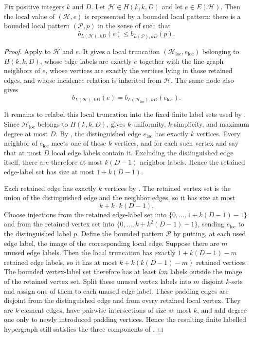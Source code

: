 \begin{helper}
Fix positive integers $k$ and $D$.  Let $\mathcal H\in H(k,k,D)$ and
let $e\in E(\mathcal H)$.  Then the local value of $(\mathcal H,e)$ is
represented by a bounded local pattern: there is a bounded local pattern
$(\mathcal P,p)$ in the sense of
 such that
\[
b_{L(\mathcal H),kD}(e)\le b_{L(\mathcal P),kD}(p).
\]
\end{helper}
\begin{proof}
Apply  to
$\mathcal H$ and $e$.  It gives a local truncation
$(\mathcal H_{\mathrm{loc}},e_{\mathrm{loc}})$ belonging to $H(k,k,D)$,
whose edge labels are exactly $e$ together with the line-graph neighbors of
$e$, whose vertices are exactly the vertices lying in those retained edges,
and whose incidence relation is inherited from $\mathcal H$.  The same node
also gives
\[
b_{L(\mathcal H),kD}(e)
=b_{L(\mathcal H_{\mathrm{loc}}),kD}(e_{\mathrm{loc}}).
\]

It remains to relabel this local truncation into the fixed finite label
sets used by .  Since
$\mathcal H_{\mathrm{loc}}$ belongs to $H(k,k,D)$,
 gives $k$-uniformity, $k$-simplicity, and maximum
degree at most $D$.  By , the distinguished edge
$e_{\mathrm{loc}}$ has exactly $k$ vertices.  Every neighbor of
$e_{\mathrm{loc}}$ meets one of these $k$ vertices, and for each such vertex
 and  say that at most
$D$ local edge labels contain it.  Excluding the distinguished edge itself,
there are therefore at most $k(D-1)$ neighbor labels.  Hence the retained
edge-label set has size at most $1+k(D-1)$.

Each retained edge has exactly $k$ vertices by .
The retained vertex set is the union of the distinguished edge and the
neighbor edges, so it has size at most
\[
k+k\cdot k(D-1).
\]
Choose injections from the retained edge-label set into
$\{0,\ldots,1+k(D-1)-1\}$ and from the retained vertex set into
$\{0,\ldots,k+k^2(D-1)-1\}$, sending $e_{\mathrm{loc}}$ to the distinguished
label $p$.  Define the bounded pattern $\mathcal P$ by putting, at each used
edge label, the image of the corresponding local edge.  Suppose there are
$m$ unused edge labels.  Then the local truncation has exactly
$1+k(D-1)-m$ retained edge labels, so it has at most
$k+k(k(D-1)-m)$ retained vertices.  The bounded vertex-label set therefore
has at least $km$ labels outside the image of the retained vertex set.  Split
these unused vertex labels into $m$ disjoint $k$-sets and assign one of them
to each unused edge label.  These padding edges are disjoint from the
distinguished edge and from every retained local vertex.  They are
$k$-element edges, have pairwise intersections of size at most $k$, and add
degree one only to newly introduced padding vertices.  Hence the resulting
finite labelled hypergraph still satisfies the three components of
.


\end{proof}
